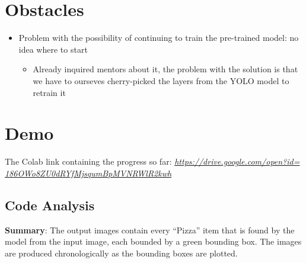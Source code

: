 \documentclass{article}
\begin{document}
\section{Obstacles}
\begin{itemize}
	\item Problem with the possibility of continuing to train the pre-trained model: no idea where to start	
	\begin{itemize}
		\item Already inquired mentors about it, the problem with the solution is that we have to ourseves cherry-picked the layers from the YOLO model to retrain it 
	\end{itemize}
\end{itemize}

\section{Demo}

The Colab link containing the progress so far: \emph{\underline{https://drive.google.com/open?id=}}\\
\emph{\underline{186OWo8ZU0dRYfMjsqumBpMVNRWlR2kwh}}

\subsection{Code Analysis}
\tab \textbf{Summary}: The output images contain every “Pizza” item that is found by the model from the input image, each bounded by a green bounding box. The images are produced chronologically as the bounding boxes are plotted.
	
\end{document}
